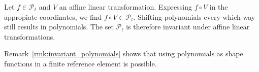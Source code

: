 \begin{remark}{\quad\label{rmk:invariant_polynomials}}
   Let $f\in\mathcal{P}_t$ and $V$ an affine linear transformation. 
   Expressing $f\circ V$ in the appropiate coordinates, we find 
   $f\circ V\in\mathcal{P}_t$. Shifting polynomials every which way 
   still results in polynomials. The set $\mathcal{P}_t$ is 
   therefore invariant under affine linear transformations.
\end{remark}
Remark~\ref{rmk:invariant_polynomials} shows that using polynomials 
as shape functions in a finite reference element is possible.